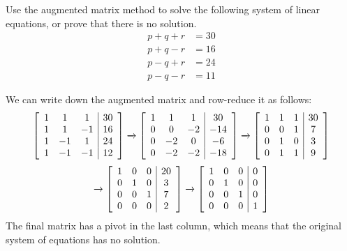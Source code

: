 \documentclass[a4paper]{amsart}
\renewenvironment{solution}{\SolutionInline}{\endSolutionInline}
\begin{document}
\begin{exercise}\label{ex-solve-iii}
 Use the augmented matrix method to solve the following system of
 linear equations, or prove that there is no solution.
 \begin{align*}
  p+q+r &= 30 \\
  p+q-r &= 16 \\
  p-q+r &= 24 \\
  p-q-r &= 11
 \end{align*}
\end{exercise}
\begin{solution}
 We can write down the augmented matrix and row-reduce it as follows:
 \[ 
  \left[\begin{array}{ccc|c}
    1 &  1 &  1 & 30 \\
    1 &  1 & -1 & 16 \\
    1 & -1 &  1 & 24 \\
    1 & -1 & -1 & 12
  \end{array}\right]
  \xrightarrow{}
  \left[\begin{array}{ccc|c}
    1 &  1 &  1 &  30 \\
    0 &  0 & -2 & -14 \\
    0 & -2 &  0 &  -6 \\
    0 & -2 & -2 & -18
  \end{array}\right]
  \xrightarrow{}
  \left[\begin{array}{ccc|c}
    1 &  1 &  1 &  30 \\
    0 &  0 &  1 &   7 \\
    0 &  1 &  0 &   3 \\
    0 &  1 &  1 &   9
  \end{array}\right]
 \] \[
  \xrightarrow{}
  \left[\begin{array}{ccc|c}
    1 &  0 &  0 &  20 \\
    0 &  1 &  0 &   3 \\
    0 &  0 &  1 &   7 \\
    0 &  0 &  0 &   2
  \end{array}\right]
  \xrightarrow{}
  \left[\begin{array}{ccc|c}
    1 &  0 &  0 &  0 \\
    0 &  1 &  0 &  0 \\
    0 &  0 &  1 &  0 \\
    0 &  0 &  0 &  1
  \end{array}\right]
 \]
 The final matrix has a pivot in the last column, which means that the
 original system of equations has no solution.
\end{solution}
\end{document}
